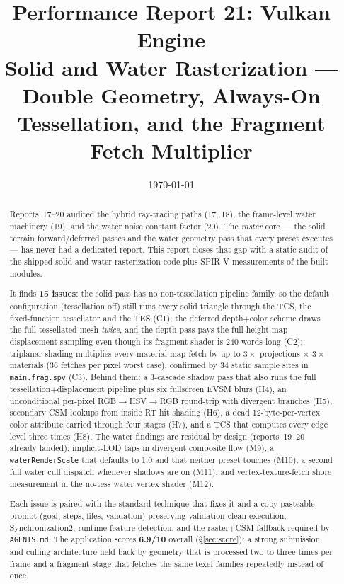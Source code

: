 \documentclass[11pt,a4paper]{article}
\title{Performance Report 21: Vulkan Engine \\
\large Solid and Water Rasterization --- Double Geometry, Always-On Tessellation, and the Fragment Fetch Multiplier}
\author{}
\date{\today}
\begin{document}
\maketitle

\begin{abstract}
Reports~17--20 audited the hybrid ray-tracing paths (17, 18), the frame-level
water machinery (19), and the water noise constant factor (20). The
\emph{raster} core --- the solid terrain forward/deferred passes and the water
geometry pass that every preset executes --- has never had a dedicated report.
This report closes that gap with a static audit of the shipped solid and water
rasterization code plus SPIR-V measurements of the built modules.

It finds \textbf{15 issues}: the solid pass has no non-tessellation pipeline
family, so the default configuration (tessellation off) still runs every solid
triangle through the TCS, the fixed-function tessellator and the TES (C1); the
deferred depth$+$color scheme draws the full tessellated mesh \emph{twice},
and the depth pass pays the full height-map displacement sampling even though
its fragment shader is 240 words long (C2); triplanar shading multiplies every
material map fetch by up to $3\times$ projections $\times$ $3\times$ materials
(36 fetches per pixel worst case), confirmed by 34 static sample sites in
\texttt{main.frag.spv} (C3). Behind them: a 3-cascade shadow pass that also
runs the full tessellation$+$displacement pipeline plus six fullscreen EVSM
blurs (H4), an unconditional per-pixel RGB$\rightarrow$HSV$\rightarrow$RGB
round-trip with divergent branches (H5), secondary CSM lookups from inside RT
hit shading (H6), a dead 12-byte-per-vertex color attribute carried through
four stages (H7), and a TCS that computes every edge level three times (H8).
The water findings are residual by design (reports~19--20 already landed):
implicit-LOD taps in divergent composite flow (M9), a \texttt{waterRenderScale}
that defaults to 1.0 and that neither preset touches (M10), a second full
water cull dispatch whenever shadows are on (M11), and vertex-texture-fetch
shore measurement in the no-tess water vertex shader (M12).

Each issue is paired with the standard technique that fixes it and a
copy-pasteable prompt (goal, steps, files, validation) preserving
validation-clean execution, Synchronization2, runtime feature detection, and
the raster$+$CSM fallback required by \texttt{AGENTS.md}. The application
scores \textbf{6.9/10} overall (\S\ref{sec:score}): a strong submission and
culling architecture held back by geometry that is processed two to three
times per frame and a fragment stage that fetches the same texel families
repeatedly instead of once.
\end{abstract}
\end{document}
